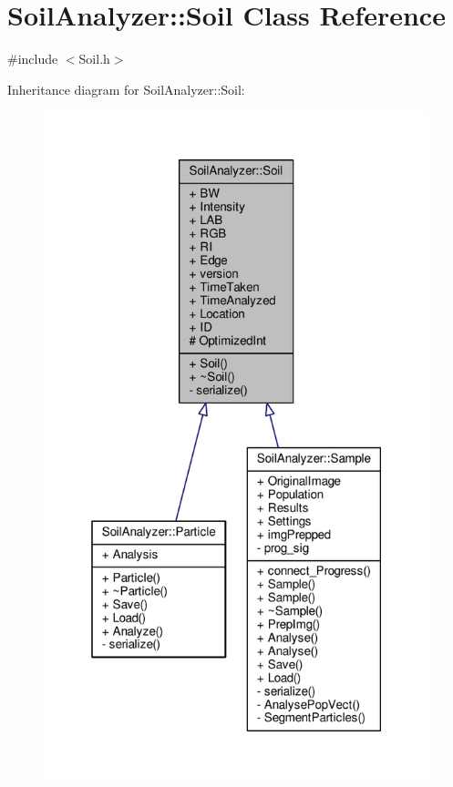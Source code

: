 \hypertarget{class_soil_analyzer_1_1_soil}{}\section{Soil\+Analyzer\+:\+:Soil Class Reference}
\label{class_soil_analyzer_1_1_soil}


{\ttfamily \#include $<$Soil.\+h$>$}



Inheritance diagram for Soil\+Analyzer\+:\+:Soil\+:\nopagebreak
\begin{figure}[H]
\begin{center}
\leavevmode
\includegraphics[height=550pt]{class_soil_analyzer_1_1_soil__inherit__graph}
\end{center}
\end{figure}


